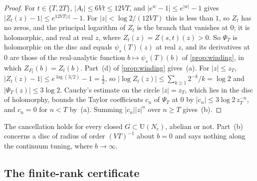 \documentclass[11pt,a4paper]{amsart}
\theoremstyle{definition}
\theoremstyle{remark}
\numberwithin{equation}{section}
\newcommand{\abs}[1]{\lvert #1\rvert}      %
\newcommand{\U}{\mathrm{U}}                %
\newcommand{\Zpart}[2]{Z(#1,#2)}           %
\newcommand{\psiT}[2]{\psi_{#1}(#2)}       %
\begin{document}
\begin{proof}
For $t\in\{T,2T\}$, $\abs{A_t}\le6Vt\le12VT$, and $\abs{e^w-1}\le e^{\abs w}-1$ gives $\abs{Z_t(z)-1}\le e^{12VT\abs z}-1$. For $\abs z<\log2/(12VT)$ this is less than $1$, so $Z_t$ has no zeros, and the principal logarithm of $Z_t$ is the branch that vanishes at $0$; it is holomorphic, and real at real $z$, where $Z_t(z)=\Zpart{s}{t}(z)>0$. So $\Psi_T$ is holomorphic on the disc and equals $\psiT{s}{T}(z)$ at real $z$, and its derivatives at $0$ are those of the real-analytic function $b\mapsto\psiT{s}{T}(b)$ of \cref{prop:winding}, in which $Z_{P_t}(b)=Z_t(b)$. Part~(d) of \cref{prop:winding} gives~(a). For $\abs z\le z_T$, $\abs{Z_t(z)-1}\le e^{\log(3/2)}-1=\frac12$, so $\abs{\log Z_t(z)}\le\sum_{k\ge1}2^{-k}/k=\log2$ and $\abs{\Psi_T(z)}\le3\log2$. Cauchy's estimate on the circle $\abs z=z_T$, which lies in the disc of holomorphy, bounds the Taylor coefficients $c_n$ of $\Psi_T$ at $0$ by $\abs{c_n}\le3\log2\,z_T^{-n}$, and $c_n=0$ for $n<T$ by~(a). Summing $\abs{c_n}\abs z^n$ over $n\ge T$ gives~(b).
\end{proof}

The cancellation holds for every closed $G\subset\U(N_c)$, abelian or not. Part~(b) concerns a disc of radius of order $(VT)^{-1}$ about $b=0$ and says nothing along the continuum tuning, where $b\to\infty$.

\subsection{The finite-rank certificate}
\end{document}
